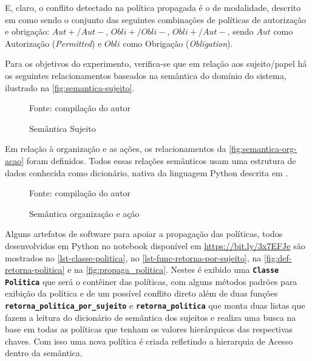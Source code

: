 E, claro, o conflito detectado na política propagada é o de modalidade, descrito em  como sendo o conjunto das seguintes combinações de políticas de autorização e obrigação: ${Aut + / Aut-}$, ${Obli + / Obli-}$, ${Obli + / Aut-}$, sendo $Aut$ como Autorização (\textit{Permitted}) e $Obli$ como Obrigação (\textit{Obligation}). 

Para os objetivos do experimento, verifica-se que em relação aos sujeito/papel há os seguintes relacionamentos baseados na semântica do domínio do sistema, ilustrado na \autoref{fig:semantica-sujeito}.

\begin{figure}[!h]
	\centering
	\caption{Semântica Sujeito}
	
	\label{fig:semantica-sujeito}
	{\scriptsize Fonte: compilação do autor}
\end{figure} 

Em relação à organização e as ações, os relacionamentos da \autoref{fig:semantica-org-acao} foram definidos. Todos essas relações semânticos usam uma estrutura de dados conhecida como dicionário, nativa da linguagem Python descrita em .
\begin{figure}[!h]
	\centering
	\caption{Semântica organização e ação}
	
	\label{fig:semantica-org-acao}
	{\scriptsize Fonte: compilação do autor}
\end{figure}

Alguns artefatos de software para apoiar a propagação das políticas, todos desenvolvidos em Python no notebook disponível em \url{https://bit.ly/3x7EFJe} são mostrados no \autoref{lst-classe-politica}, no \autoref{lst-func-retorna-por-sujeito}, na \autoref{fig:def-retorna-politica} e na \autoref{fig:propaga_politica}. Nestes é exibido uma \texttt{\textbf{Classe Politica}} que será o contêiner das políticas, com alguns métodos padrões para exibição da política e de um possível conflito direto além de duas funções \texttt{\textbf{retorna\_politica\_por\_sujeito}} e \texttt{\textbf{retorna\_politica}} que monta duas listas que fazem a leitura do dicionário de semântica dos sujeitos e realiza uma busca na base em todas as políticas que tenham os valores hierárquicos das respectivas chaves. Com isso uma nova política é criada refletindo a hierarquia de Acesso dentro da semântica.


